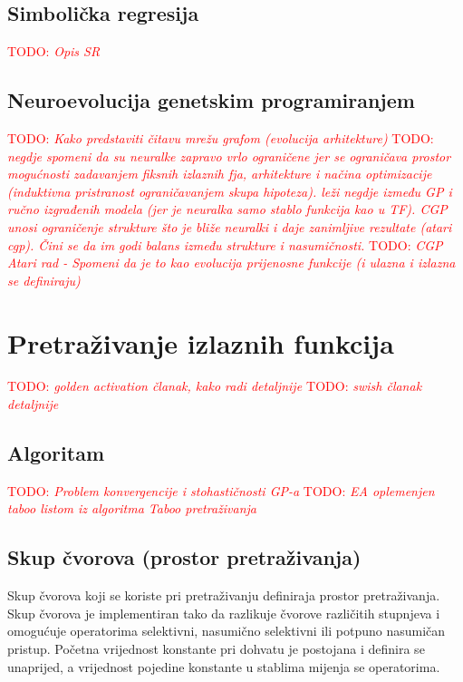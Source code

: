 \documentclass[times, utf8, numeric, diplomski]{fer}
\def\TODO#1{\noindent\textcolor{red}{TODO: \textit{#1}}\newline}
\def\todo#1{\TODO{#1}}
\begin{document}
\subsection{Simbolička regresija}
\todo{Opis SR}

\subsection{Neuroevolucija genetskim programiranjem}
\todo{Kako predstaviti čitavu mrežu grafom (evolucija arhitekture)}
\todo{negdje spomeni da su neuralke zapravo vrlo ograničene jer se ograničava prostor mogućnosti zadavanjem fiksnih izlaznih fja, arhitekture i načina optimizacije (induktivna pristranost ograničavanjem skupa hipoteza). leži negdje između GP i ručno izgrađenih modela (jer je neuralka samo stablo funkcija kao u TF). CGP unosi ograničenje strukture što je bliže neuralki i daje zanimljive rezultate (atari cgp). Čini se da im godi balans između strukture i nasumičnosti.}
\todo{CGP Atari rad - Spomeni da je to kao evolucija prijenosne funkcije (i ulazna i izlazna se definiraju)}

\section{Pretraživanje izlaznih funkcija}
\todo{golden activation članak, kako radi detaljnije \citep{elish}}
\todo{swish članak detaljnije \citep{swish}}

\subsection{Algoritam}
\todo{Problem konvergencije i stohastičnosti GP-a}
\todo{EA oplemenjen taboo listom iz algoritma Taboo pretraživanja}

\subsection{Skup čvorova (prostor pretraživanja)}
\label{sec:node_set}
Skup čvorova koji se koriste pri pretraživanju definiraja prostor pretraživanja. Skup čvorova je implementiran tako da razlikuje čvorove različitih stupnjeva i omogućuje operatorima selektivni, nasumično selektivni ili potpuno nasumičan pristup. Početna vrijednost konstante pri dohvatu je postojana i definira se unaprijed, a vrijednost pojedine konstante u stablima mijenja se operatorima.
\end{document}

